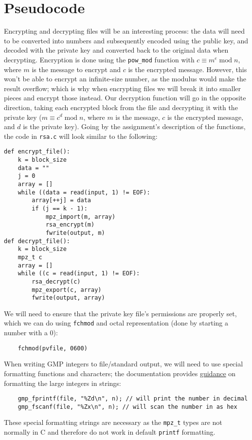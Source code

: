 \documentclass[12pt]{article}
\begin{document}
\section{Pseudocode}
Encrypting and decrypting files will be an interesting process: the data will need to be converted into numbers and subsequently encoded using the public key, and decoded with the private key and converted back to the original data when decrypting. Encryption is done using the \verb|pow_mod| function with $c \equiv m^e\;\mathrm{mod}\; n$, where $m$ is the message to encrypt and $c$ is the encrypted message. However, this won't be able to encrypt an infinite-size number, as the modulus would make the result overflow; which is why when encrypting files we will break it into smaller pieces and encrypt those instead. Our decryption function will go in the opposite direction, taking each encrypted block from the file and decrypting it with the private key ($m \equiv c^d\;\mathrm{mod}\; n$, where $m$ is the message, $c$ is the encrypted message, and $d$ is the private key). Going by the assignment's description of the functions, the code in \verb|rsa.c| will look similar to the following:\begin{verbatim}
def encrypt_file():
    k = block_size
    data = ""
    j = 0
    array = []
    while ((data = read(input, 1) != EOF):
        array[++j] = data
        if (j == k - 1):
            mpz_import(m, array)
            rsa_encrypt(m)
            fwrite(output, m)
def decrypt_file():
    k = block_size
    mpz_t c
    array = []
    while ((c = read(input, 1) != EOF):
        rsa_decrypt(c)
        mpz_export(c, array)
        fwrite(output, array)
\end{verbatim}
We will need to ensure that the private key file's permissions are properly set, which we can do using \verb|fchmod| and octal representation (done by starting a number with a $0$):\begin{verbatim}
    fchmod(pvfile, 0600)
\end{verbatim}
When writing GMP integers to file/standard output, we will need to use special formatting functions and characters; the documentation provides \href{https://gmplib.org/gmp-man-6.0.0a.pdf#Formatted\%20Output\%20Strings}{guidance} on formatting the large integers in strings:\begin{verbatim}
    gmp_fprintf(file, "%Zd\n", n); // will print the number in decimal
    gmp_fscanf(file, "%Zx\n", n); // will scan the number in as hex
\end{verbatim}
These special formatting strings are necessary as the \verb|mpz_t| types are not normally in C and therefore do not work in default \verb|printf| formatting.
\end{document}
